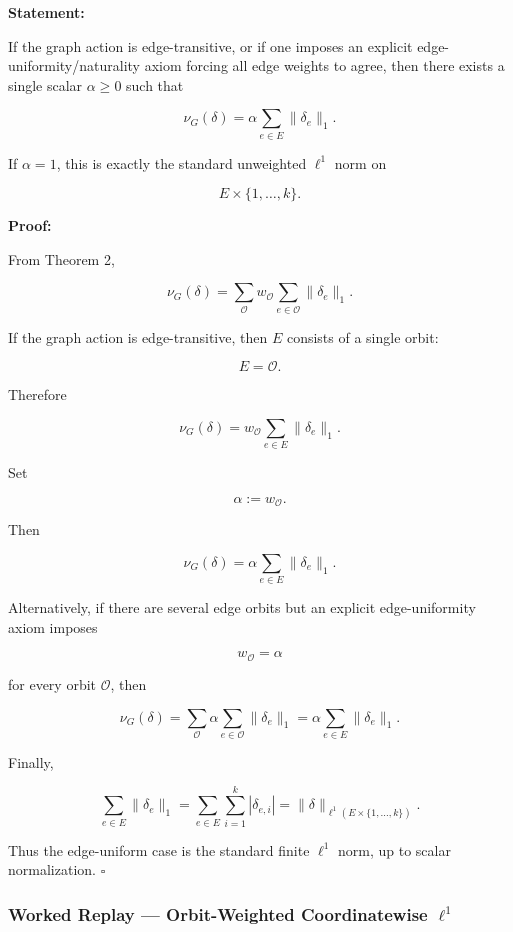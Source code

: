 \documentclass[
  11pt,
]{article}
\begin{document}
\textbf{Statement:}

If the graph action is edge-transitive, or if one imposes an explicit
edge-uniformity/naturality axiom forcing all edge weights to agree, then
there exists a single scalar \(\alpha\ge0\) such that

\[
\nu_G(\delta) = \alpha\sum_{e\in E}\|\delta_e\|_1.
\]

If \(\alpha=1\), this is exactly the standard unweighted \(\ell^1\) norm
on

\[
E\times\{1,\ldots,k\}.
\]

\textbf{Proof:}

From Theorem 2,

\[
\nu_G(\delta) = \sum_{\mathcal O} w_{\mathcal O} \sum_{e\in\mathcal O} \|\delta_e\|_1.
\]

If the graph action is edge-transitive, then \(E\) consists of a single
orbit:

\[
E=\mathcal O.
\]

Therefore

\[
\nu_G(\delta)=w_{\mathcal O}\sum_{e\in E}\|\delta_e\|_1.
\]

Set

\[
\alpha:=w_{\mathcal O}.
\]

Then

\[
\nu_G(\delta)=\alpha\sum_{e\in E}\|\delta_e\|_1.
\]

Alternatively, if there are several edge orbits but an explicit
edge-uniformity axiom imposes

\[
w_{\mathcal O}=\alpha
\]

for every orbit \(\mathcal O\), then

\[
\nu_G(\delta) = \sum_{\mathcal O} \alpha \sum_{e\in\mathcal O} \|\delta_e\|_1 = \alpha \sum_{e\in E} \|\delta_e\|_1.
\]

Finally,

\[
\sum_{e\in E}\|\delta_e\|_1 = \sum_{e\in E}\sum_{i=1}^k |\delta_{e,i}| = \|\delta\|_{\ell^1(E\times\{1,\ldots,k\})}.
\]

Thus the edge-uniform case is the standard finite \(\ell^1\) norm, up to
scalar normalization. \(\square\)

\hypertarget{worked-replay-orbit-weighted-coordinatewise-ell1}{%
\subsubsection{\texorpdfstring{Worked Replay --- Orbit-Weighted
Coordinatewise
\(\ell^1\)}{Worked Replay --- Orbit-Weighted Coordinatewise \textbackslash ell\^{}1}}\label{worked-replay-orbit-weighted-coordinatewise-ell1}}
\end{document}
